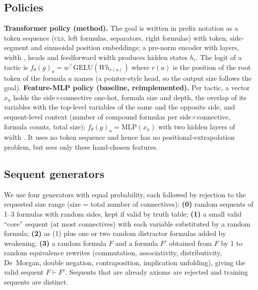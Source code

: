 \subsection{Policies}
\textbf{Transformer policy (method).} The goal is written in prefix notation as a token sequence (\textsc{cls}, left formulas, separators, right formulas) with token, side-segment and sinusoidal position embeddings; a pre-norm encoder with  layers, width ,  heads and feedforward width  produces hidden states $h_i$. The logit of a tactic is $f_\theta(g)_a=w^\top\mathrm{GELU}(W h_{r(a)})$ where $r(a)$ is the position of the root token of the formula $a$ names (a pointer-style head, so the output size follows the goal).
\textbf{Feature-MLP policy (baseline, reimplemented).} Per tactic, a vector $x_a$ holds the side$\times$connective one-hot, formula size and depth, the overlap of its variables with the top-level variables of the same and the opposite side, and sequent-level context (number of compound formulas per side$\times$connective, formula counts, total size); $f_\theta(g)_a=\mathrm{MLP}(x_a)$ with two hidden layers of width . It uses no token sequence and hence has no positional-extrapolation problem, but sees only these hand-chosen features.

\subsection{Sequent generators}
We use four generators with equal probability, each followed by rejection to the requested size range (size = total number of connectives): \textbf{(0)} random sequents of 1--3 formulas with random sides, kept if valid by truth table; \textbf{(1)} a small valid ``core'' sequent (at most  connectives) with each variable substituted by a random formula; \textbf{(2)} as (1) plus one or two random distractor formulas added by weakening; \textbf{(3)} a random formula $F$ and a formula $F'$ obtained from $F$ by 1 to  random equivalence rewrites (commutation, associativity, distributivity, De~Morgan, double negation, contraposition, implication unfolding), giving the valid sequent $F\vdash F'$. Sequents that are already axioms are rejected and training sequents are distinct.
